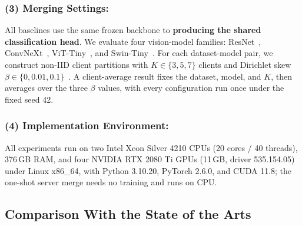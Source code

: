 \documentclass[letterpaper]{article} %
\begin{document}
\subsubsection{(3) Merging Settings:}



All baselines use the same frozen backbone to \textbf{producing the shared classification head}. We evaluate four vision-model families: ResNet~\cite{he2016deep}, ConvNeXt~\cite{liu2022convnet}, ViT-Tiny~\cite{dosovitskiy2021image}, and Swin-Tiny~\cite{liu2021swin}. For each dataset-model pair, we construct non-IID client partitions with $K\in\{3,5,7\}$ clients and Dirichlet skew $\beta\in\{0,0.01,0.1\}$~\cite{hsu2019measuringeffectsnonidenticaldata}. A client-average result fixes the dataset, model, and $K$, then averages over the three $\beta$ values, with every configuration run once under the fixed seed 42.

\subsubsection{(4) Implementation Environment:}

All experiments run on two Intel Xeon Silver 4210 CPUs (20 cores / 40 threads), 376\,GB RAM, and four NVIDIA RTX 2080 Ti GPUs (11\,GB, driver 535.154.05) under Linux x86\_64, with Python 3.10.20, PyTorch 2.6.0, and CUDA 11.8; the one-shot server merge needs no training and runs on CPU.

\subsection{Comparison With the State of the Arts}

\end{document}
